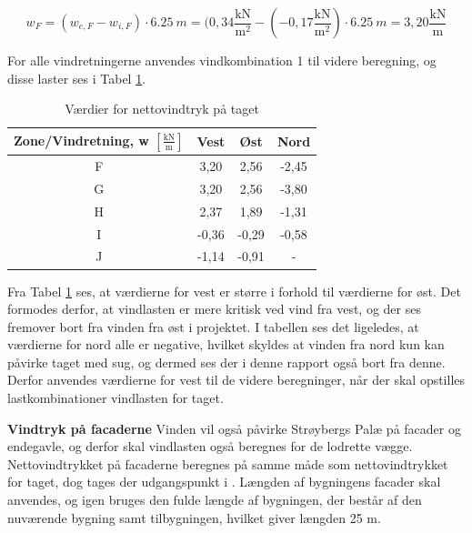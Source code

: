 \begin{equation} 
	w_F = (w_{e,F}-w_{i,F})\cdot \SI{6,25}{m} = (0,\!34 \frac{\text{kN}}{\text{m}^2} - (-0,\!17 \frac{\text{kN}}{\text{m}^2})\cdot \SI{6,25}{m} = 3,\!20 \frac{\text{kN}}{\text{m}}
\end{equation}

For alle vindretningerne anvendes vindkombination 1 til videre beregning, og disse laster ses i Tabel \ref{tab:bb}. 

\begin{table}[htb]
	\begin{center}
		\begin{tabular}{ c c c c } 
			\hline
			Zone/Vindretning, w $[\frac{\text{kN}}{\text{m}}]$ & Vest & Øst & Nord \\	\hline
			F & 3,20 & 2,56 & -2,45 \\
			G & 3,20 & 2,56 & -3,80 \\	
			H & 2,37 & 1,89 & -1,31 \\ 	
			I & -0,36 & -0,29 & -0,58 \\
			J & -1,14 & -0,91 & - \\
		\end{tabular}
		\caption{Værdier for nettovindtryk på taget}
		\label{tab:bb}
	\end{center}
\end{table}

Fra Tabel \ref{tab:bb} ses, at værdierne for vest er større i forhold til værdierne for øst. Det formodes derfor, at vindlasten er mere kritisk ved vind fra vest, og der ses fremover bort fra vinden fra øst i projektet. I tabellen ses det ligeledes, at værdierne for nord alle er negative, hvilket skyldes at vinden fra nord kun kan påvirke taget med sug, og dermed ses der i denne rapport også bort fra denne. 
\newline \indent{     }  Derfor anvendes værdierne for vest til de videre beregninger, når der skal opstilles lastkombinationer vindlasten for taget.


\textbf{Vindtryk på facaderne}
\newline
Vinden vil også påvirke Strøybergs Palæ på facader og endegavle, og derfor skal vindlasten også beregnes for de lodrette vægge.
\newline \indent{     }  Nettovindtrykket på facaderne beregnes på samme måde som nettovindtrykket for taget, dog tages der udgangspunkt i \citep[ tabel 7.1]{EU91}. Længden af bygningens facader skal anvendes, og igen bruges den fulde længde af bygningen, der består af den nuværende bygning samt tilbygningen, hvilket giver længden 25 m. 



